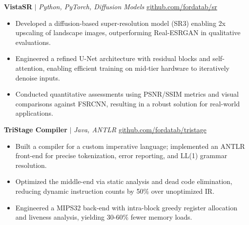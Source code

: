\documentclass[10pt]{article}
\begin{document}
\textbf{VistaSR} $|$ \emph{Python, PyTorch, Diffusion Models} \hfill \href{https://github.com/fordatab/sr}{github.com/fordatab/sr}
\vspace{-2pt}
\begin{itemize}
    \item Developed a diffusion-based super-resolution model (SR3) enabling 2x upscaling of landscape images, outperforming Real-ESRGAN in qualitative evaluations.
    \item Engineered a refined U-Net architecture with residual blocks and self-attention, enabling efficient training on mid-tier hardware to iteratively denoise inputs.
    \item Conducted quantitative assessments using PSNR/SSIM metrics and visual comparisons against FSRCNN, resulting in a robust solution for real-world applications.
\end{itemize}
\vspace{2pt}

\textbf{TriStage Compiler} $|$ \emph{Java, ANTLR} \hfill \href{https://github.com/fordatab/tristage}{github.com/fordatab/tristage}
\vspace{-2pt}
\begin{itemize}
    \item Built a compiler for a custom imperative language; implemented an ANTLR front-end for precise tokenization, error reporting, and LL(1) grammar resolution.
    \item Optimized the middle-end via static analysis and dead code elimination, reducing dynamic instruction counts by 50\% over unoptimized IR.
    \item Engineered a MIPS32 back-end with intra-block greedy register allocation and liveness analysis, yielding 30-60\% fewer memory loads.
\end{itemize}

\end{document}
